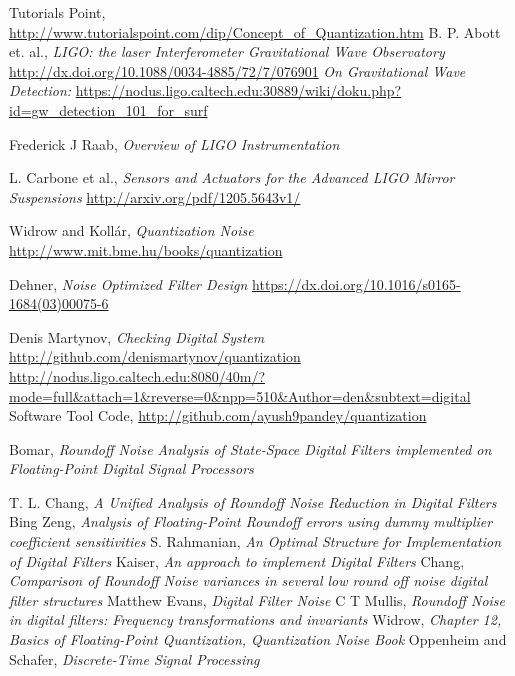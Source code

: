 \documentclass[a4paper,12pt]{article}
\begin{document}
\begin{thebibliography}{100}  

 Tutorials Point, \url{http://www.tutorialspoint.com/dip/Concept_of_Quantization.htm}
 B. P. Abott et. al.,  
				\emph{LIGO: the laser Interferometer Gravitational Wave Observatory} 							\url{http://dx.doi.org/10.1088/0034-4885/72/7/076901}
 \emph{On Gravitational Wave Detection: }
			\url{https://nodus.ligo.caltech.edu:30889/wiki/doku.php?id=gw_detection_101_for_surf}

 Frederick J Raab, \emph{Overview of LIGO Instrumentation}

 L. Carbone et al., \emph{Sensors and Actuators for the Advanced LIGO Mirror Suspensions}
									\url{http://arxiv.org/pdf/1205.5643v1/}
									
 Widrow and Koll\'ar, \emph{Quantization Noise} 				\url{http://www.mit.bme.hu/books/quantization}

 Dehner, \emph{Noise Optimized Filter Design} 		\url{https://dx.doi.org/10.1016/s0165-1684(03)00075-6}


 Denis Martynov, \emph{Checking Digital System} \url{http://github.com/denismartynov/quantization}
\url{http://nodus.ligo.caltech.edu:8080/40m/?mode=full&attach=1&reverse=0&npp=510&Author=den&subtext=digital}  
 Software Tool Code, \url{http://github.com/ayush9pandey/quantization}

 Bomar, \emph{Roundoff Noise Analysis of State-Space Digital Filters implemented on Floating-Point Digital Signal Processors}

 T. L. Chang, \emph{A Unified Analysis of Roundoff Noise Reduction in Digital Filters}
 Bing Zeng, \emph{Analysis of Floating-Point Roundoff errors using dummy multiplier coefficient sensitivities}
 S. Rahmanian, \emph{An Optimal Structure for Implementation of Digital Filters}
 Kaiser, \emph{An approach to implement Digital Filters}
 Chang, \emph{Comparison of Roundoff Noise variances in several low round off noise digital filter structures}
 Matthew Evans, \emph{Digital Filter Noise}
C T Mullis, \emph{Roundoff Noise in digital filters: Frequency transformations and invariants}
 Widrow, \emph{Chapter 12, Basics of Floating-Point Quantization, Quantization Noise Book}
 Oppenheim and Schafer, \emph{Discrete-Time Signal Processing}


\end{thebibliography}
\end{document}
